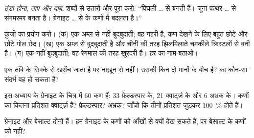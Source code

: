 \begin{exercise}[$\star$]\label{exo:g6:rocks-and-minerals:4}
\emph{ठंडा होना}, \emph{ताप और दाब},
\emph{} शब्दों से उतारो और पूरा करो: ``पिघली  \ldots{} से  बनती है।
चूना पत्थर \ldots{} से संगमरमर बनता है। ग्रेनाइट \ldots{} से  के कणों
में बदलता है।''
\end{exercise}

\begin{exercise}[$\star\star$]\label{exo:g6:rocks-and-minerals:5}
कुंजी का प्रयोग करो। (क) एक  अम्ल से नहीं बुदबुदाती; वह गहरी है, कण
देखने के लिए बहुत छोटे और छोटे गोल छेद। (ख) एक  अम्ल से बुदबुदाती है और
चीनी की तरह झिलमिलाते चमकीले क्रिस्टलों से बनी है। (ग) एक  नहीं
बुदबुदाती; वह रेगमाल की तरह खुरदरी है। हर  का नाम बताओ।
\end{exercise}

\begin{exercise}[$\star\star$]\label{exo:g6:rocks-and-minerals:6}
एक  ताँबे के सिक्के से खरोंच जाता है पर नाख़ून से नहीं। उसकी  किन दो
मानों के बीच है?  का कौन-सा संदर्भ 
वह हो सकता है?
\end{exercise}

\begin{exercise}[$\star\star$]\label{exo:g6:rocks-and-minerals:7}
इस अध्याय के ग्रेनाइट के चित्र में 60 कण हैं: 33
फ़ेल्डस्पार के, 21 क्वार्ट्ज़ के और 6 अभ्रक के। कणों का कितना प्रतिशत
क्वार्ट्ज़ है? फ़ेल्डस्पार? अभ्रक? जाँचो कि तीनों प्रतिशत जुड़कर
100~\% होते हैं।
\end{exercise}

\begin{exercise}[$\star\star$]\label{exo:g6:rocks-and-minerals:8}
ग्रेनाइट और बेसाल्ट दोनों  हैं। हम ग्रेनाइट के कणों को आँखों से क्यों
देख सकते हैं, पर बेसाल्ट के कणों को नहीं?
\end{exercise}

